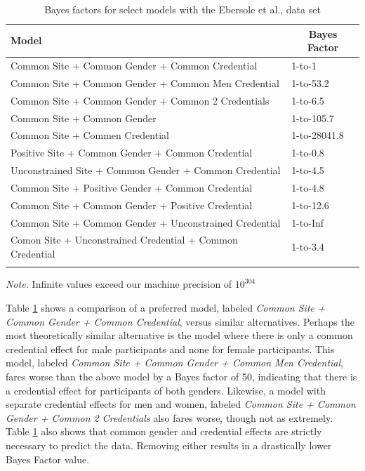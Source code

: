 \documentclass[english,man]{apa6}
\theoremstyle{definition}
\theoremstyle{definition}
\theoremstyle{remark}
\begin{document}
\begin{table}[tbp]
\begin{center}
\begin{threeparttable}
\caption{\label{tab:ml3BF}Bayes factors for select models with the Ebersole et al., data set}
\begin{tabular}{ll}
\toprule
Model & \multicolumn{1}{c}{Bayes Factor}\\
\midrule
Common Site + Common Gender + Common Credential & 1-to-1\\
Common Site + Common Gender + Common Men Credential & 1-to-53.2\\
Common Site + Common Gender + Common 2 Credentials & 1-to-6.5\\
Common Site + Common Gender & 1-to-105.7\\
Common Site + Commen Credential & 1-to-28041.8\\
Positive Site + Common Gender + Common Credential & 1-to-0.8\\
Unconstrained Site + Common Gender + Common Credential & 1-to-4.5\\
Common Site + Positive Gender + Common Credential & 1-to-4.8\\
Common Site + Common Gender + Positive Credential & 1-to-12.6\\
Common Site + Common Gender + Unconstrained Credential & 1-to-Inf\\
Comon Site + Unconstrained Credential + Common Credential & 1-to-3.4\\
\bottomrule
\addlinespace
\end{tabular}
\begin{tablenotes}[para]
\textit{Note.} Infinite values exceed our machine precision of $10^304$
\end{tablenotes}
\end{threeparttable}
\end{center}
\end{table}

Table \ref{tab:ml3BF} shows a comparison of a preferred model, labeled
\emph{Common Site + Common Gender + Common Credential}, versus similar
alternatives. Perhaps the most theoretically similar alternative is the
model where there is only a common credential effect for male
participants and none for female participants. This model, labeled
\emph{Common Site + Common Gender + Common Men Credential}, fares worse
than the above model by a Bayes factor of 50, indicating that there is a
credential effect for participants of both genders. Likewise, a model
with separate credential effects for men and women, labeled \emph{Common
Site + Common Gender + Common 2 Credentials} also fares worse, though
not as extremely. Table \ref{tab:ml3BF} also shows that common gender
and credential effects are strictly necessary to predict the data.
Removing either results in a drastically lower Bayes Factor value.
\end{document}
